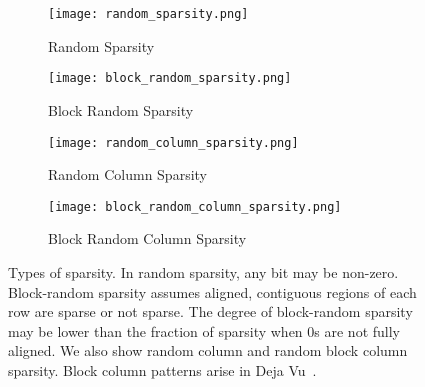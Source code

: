 \documentclass{article}
\begin{document}
\begin{figure}[h]
    \centering
    \begin{subfigure}{0.45\textwidth}
        \texttt{[image: random\_sparsity.png]}
        \caption{Random Sparsity}
    \end{subfigure}
    \hfill
    \begin{subfigure}{0.45\textwidth}
        \texttt{[image: block\_random\_sparsity.png]}
        \caption{Block Random Sparsity}
    \end{subfigure}
    
    \bigskip
    
    \begin{subfigure}{0.45\textwidth}
        \texttt{[image: random\_column\_sparsity.png]}
        \caption{Random Column Sparsity}
    \end{subfigure}
    \hfill
    \begin{subfigure}{0.45\textwidth}
        \texttt{[image: block\_random\_column\_sparsity.png]}
        \caption{Block Random Column Sparsity}
    \end{subfigure}
    
    \caption{Types of sparsity. In random sparsity, any bit may be non-zero. Block-random sparsity assumes aligned, contiguous regions of each row are sparse or not sparse. The degree of block-random sparsity may be lower than the fraction of sparsity when 0s are not fully aligned. We also show random column and random block column sparsity. Block column patterns arise in Deja Vu~\cite{liu2023deja}.}
    \label{fig:sparsity_types}
\end{figure}
\end{document}
